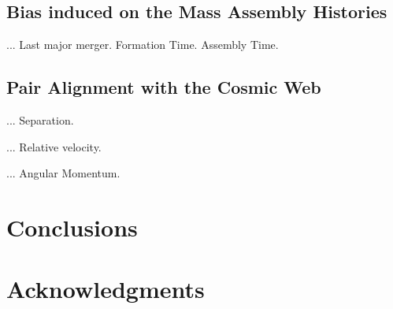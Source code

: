 \documentclass[usenatbib]{latex/mn2e}
\begin{document}
\subsection{Bias induced on the Mass Assembly Histories}
\label{subsec:bias_MAH}

... Last major merger. Formation Time. Assembly Time.

\subsection{Pair Alignment with the Cosmic Web}
\label{subsec:alignment_cosmic_web}

... Separation.

... Relative velocity.

... Angular Momentum.


\section{Conclusions}
\label{sec:conclusions}


\section*{Acknowledgments}  



 




\end{document}
